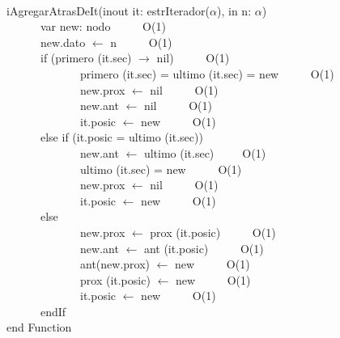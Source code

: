 \documentclass[a4paper,10pt]{article}
\begin{document}
\begin{algoritmo}
\caption{}\\
  iAgregarAtrasDeIt(inout it: estrIterador($\alpha$), in n: $\alpha$)\\
	\indent \ \ \ \ \ \ var new: nodo \ \ \ \ \ O(1)\\   
	\indent \ \ \ \ \ \ new.dato $\gets$ n \ \ \ \ \ O(1)\\   
	\indent \ \ \ \ \ \ if (primero (it.sec) $\rightarrow$ nil) \ \ \ \ \ O(1)\\  
	\indent \ \ \ \ \ \ \ \ \ \ \ \ \  primero (it.sec) = ultimo (it.sec) = new \ \ \ \ \ O(1)\\  
	\indent \ \ \ \ \ \ \ \ \ \ \ \ \  new.prox $\gets$ nil \ \ \ \ \ O(1)\\  
	\indent \ \ \ \ \ \ \ \ \ \ \ \ \  new.ant  $\gets$ nil \ \ \ \ \ O(1)\\  
	\indent \ \ \ \ \ \ \ \ \ \ \ \ \  it.posic $\gets$ new \ \ \ \ \ O(1)\\  
	\indent \ \ \ \ \ \ else if (it.posic = ultimo (it.sec))\ \ \ \ \ \\  
	\indent \ \ \ \ \ \ \ \ \ \ \ \ \  new.ant $\gets$ ultimo (it.sec)\ \ \ \ \ O(1)\\  
	\indent \ \ \ \ \ \ \ \ \ \ \ \ \  ultimo (it.sec) = new \ \ \ \ \ O(1)\\  
	\indent \ \ \ \ \ \ \ \ \ \ \ \ \  new.prox $\gets$ nil \ \ \ \ \ O(1)\\  
	\indent \ \ \ \ \ \ \ \ \ \ \ \ \  it.posic $\gets$ new \ \ \ \ \ O(1)\\ 
	\indent \ \ \ \ \ \ else \ \ \ \ \ \\  	
	\indent \ \ \ \ \ \ \ \ \ \ \ \ \  new.prox $\gets$ prox (it.posic) \ \ \ \ \ O(1)\\  
	\indent \ \ \ \ \ \ \ \ \ \ \ \ \  new.ant $\gets$ ant (it.posic) \ \ \ \ \ O(1)\\  
	\indent \ \ \ \ \ \ \ \ \ \ \ \ \  ant(new.prox) $\gets$ new \ \ \ \ \ O(1)\\ 
	\indent \ \ \ \ \ \ \ \ \ \ \ \ \  prox (it.posic) $\gets$ new \ \ \ \ \ O(1)\\  
	\indent \ \ \ \ \ \ \ \ \ \ \ \ \  it.posic $\gets$ new \ \ \ \ \ O(1)\\
	\indent \ \ \ \ \ \ endIf \ \ \ \ \ \\  	
end Function 
\end{algoritmo}
\end{document}

